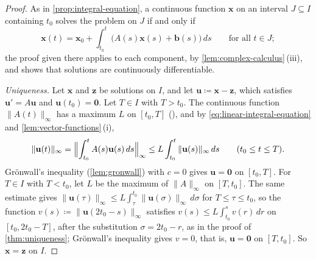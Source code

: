 \begin{proof}
As in \cref{prop:integral-equation}, a continuous function $\mathbf x$ on an interval $J\subseteq I$ containing $t_0$ solves the problem on $J$ if and only if
\begin{equation}
\mathbf x(t)=\mathbf x_0+\int_{t_0}^t\bigl(A(s)\mathbf x(s)+\mathbf b(s)\bigr)\,ds\qquad\text{for all }t\in J ;
\label{eq:linear-integral-equation}
\end{equation}
the proof given there applies to each component, by \cref{lem:complex-calculus}\,(iii), and shows that solutions are continuously differentiable.

\emph{Uniqueness.} Let $\mathbf x$ and $\mathbf z$ be solutions on $I$, and let $\mathbf u\coloneqq\mathbf x-\mathbf z$, which satisfies $\mathbf u'=A\mathbf u$ and $\mathbf u(t_0)=\mathbf 0$. Let $T\in I$ with $T>t_0$. The continuous function $\|A(t)\|_\infty$ has a maximum $L$ on $[t_0,T]$ (), and by \eqref{eq:linear-integral-equation} and \cref{lem:vector-functions}\,(i),
\[
\|\mathbf u(t)\|_\infty=\Bigl\|\int_{t_0}^tA(s)\mathbf u(s)\,ds\Bigr\|_\infty\le L\int_{t_0}^t\|\mathbf u(s)\|_\infty\,ds\qquad(t_0\le t\le T).
\]
Gr\"onwall's inequality (\cref{lem:gronwall}) with $c=0$ gives $\mathbf u=\mathbf 0$ on $[t_0,T]$. For $T\in I$ with $T<t_0$, let $L$ be the maximum of $\|A\|_\infty$ on $[T,t_0]$. The same estimate gives $\|\mathbf u(\tau)\|_\infty\le L\int_\tau^{t_0}\|\mathbf u(\sigma)\|_\infty\,d\sigma$ for $T\le\tau\le t_0$, so the function $v(s)\coloneqq\|\mathbf u(2t_0-s)\|_\infty$ satisfies $v(s)\le L\int_{t_0}^sv(r)\,dr$ on $[t_0,2t_0-T]$, after the substitution $\sigma=2t_0-r$, as in the proof of \cref{thm:uniqueness}; Gr\"onwall's inequality gives $v=0$, that is, $\mathbf u=\mathbf 0$ on $[T,t_0]$. So $\mathbf x=\mathbf z$ on $I$.


\end{proof}
